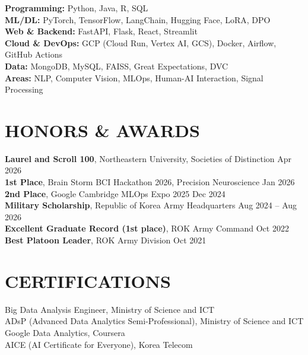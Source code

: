 \documentclass[11pt,a4paper]{article}
\begin{document}
\textbf{Programming:} Python, Java, R, SQL\\
\textbf{ML/DL:} PyTorch, TensorFlow, LangChain, Hugging Face, LoRA, DPO\\
\textbf{Web \& Backend:} FastAPI, Flask, React, Streamlit\\
\textbf{Cloud \& DevOps:} GCP (Cloud Run, Vertex AI, GCS), Docker, Airflow, GitHub Actions\\
\textbf{Data:} MongoDB, MySQL, FAISS, Great Expectations, DVC\\
\textbf{Areas:} NLP, Computer Vision, MLOps, Human-AI Interaction, Signal Processing

\section{HONORS \& AWARDS}

\textbf{Laurel and Scroll 100}, Northeastern University, Societies of Distinction \hfill Apr 2026\\
\textbf{1st Place}, Brain Storm BCI Hackathon 2026, Precision Neuroscience \hfill Jan 2026\\
\textbf{2nd Place}, Google Cambridge MLOps Expo 2025 \hfill Dec 2024\\
\textbf{Military Scholarship}, Republic of Korea Army Headquarters \hfill Aug 2024 -- Aug 2026\\
\textbf{Excellent Graduate Record (1st place)}, ROK Army Command \hfill Oct 2022\\
\textbf{Best Platoon Leader}, ROK Army Division \hfill Oct 2021

\section{CERTIFICATIONS}

Big Data Analysis Engineer, Ministry of Science and ICT\\
ADsP (Advanced Data Analytics Semi-Professional), Ministry of Science and ICT\\
Google Data Analytics, Coursera\\
AICE (AI Certificate for Everyone), Korea Telecom
\end{document}
